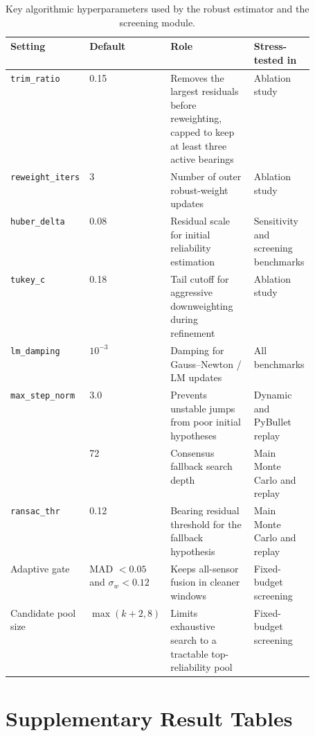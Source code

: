 \begin{table}[H]
\centering
\caption{Key algorithmic hyperparameters used by the robust estimator and the screening module.}
\label{tab:hyperparams}
\small
\begin{tabularx}{\linewidth}{Q{0.22\linewidth} Q{0.12\linewidth} Z Q{0.17\linewidth}}
\toprule
Setting & Default & Role & Stress-tested in \\
\midrule
\texttt{trim\_ratio} & 0.15 & Removes the largest residuals before reweighting, capped to keep at least three active bearings & Ablation study \\
\texttt{reweight\_iters} & 3 & Number of outer robust-weight updates & Ablation study \\
\texttt{huber\_delta} & 0.08 & Residual scale for initial reliability estimation & Sensitivity and screening benchmarks \\
\texttt{tukey\_c} & 0.18 & Tail cutoff for aggressive downweighting during refinement & Ablation study \\
\texttt{lm\_damping} & $10^{-3}$ & Damping for Gauss--Newton / LM updates & All benchmarks \\
\texttt{max\_step\_norm} & 3.0 & Prevents unstable jumps from poor initial hypotheses & Dynamic and PyBullet replay \\
\texttt{} & 72 & Consensus fallback search depth & Main Monte Carlo and replay \\
\texttt{ransac\_thr} & 0.12 & Bearing residual threshold for the fallback hypothesis & Main Monte Carlo and replay \\
Adaptive gate & MAD $<0.05$ and $\sigma_w<0.12$ & Keeps all-sensor fusion in cleaner windows & Fixed-budget screening \\
Candidate pool size & $\max(k+2,8)$ & Limits exhaustive search to a tractable top-reliability pool & Fixed-budget screening \\
\bottomrule
\end{tabularx}
\end{table}

\section{Supplementary Result Tables}
\label{app:suppresults}

